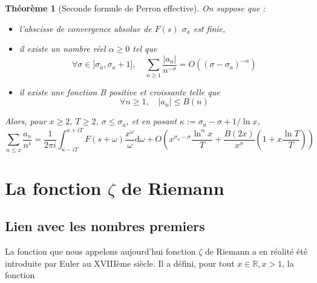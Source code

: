 \documentclass[french]{report}
\newtheorem{theorem}{Théorème}[section]
\begin{document}
\begin{theorem}[Seconde formule de Perron effective]\label{eq:perron-2-effective}
  On suppose que :
  \begin{itemize}
    \item l'abscisse de convergence absolue de $F(s)$ $\sigma_a$ est finie,
    \item il existe un nombre réel $\alpha\geq0$ tel que
    \[ \forall\sigma\in]\sigma_a,\sigma_a+1],\quad\sum_{n\geq1}\frac{|a_n|}{n^{-\sigma}}=O((\sigma-\sigma_a)^{-\alpha}) \]
    \item il existe une fonction B positive et croissante telle que
    \[ \forall n\geq1,\quad|a_n|\leq B(n) \]
  \end{itemize}
  Alors, pour $x\geq2$, $T\geq2$, $\sigma\leq\sigma_a$, et en posant $\kappa:=\sigma_a-\sigma+1/\ln x$,
  \[ \sum_{n\leq x}\frac{a_n}{n^s}=\frac{1}{2\pi i}\int_{\kappa-iT}^{\kappa+iT}F(s+\omega)\frac{x^\omega}{\omega}\mathrm{d}\omega + O\left(x^{\sigma_a-\sigma}\frac{\ln^\alpha x}{T}+\frac{B(2x)}{x^\sigma}\left(1+x\frac{\ln T}{T}\right)\right) \]
\end{theorem}

\chapter{La fonction $\zeta$ de Riemann}

\section{Lien avec les nombres premiers}

La fonction que nous appelons aujourd'hui fonction $\zeta$ de Riemann a en réalité été introduite par Euler au XVIIIème siècle. Il a défini, pour tout $x\in\mathbb{R}, x>1$, la fonction
\end{document}
